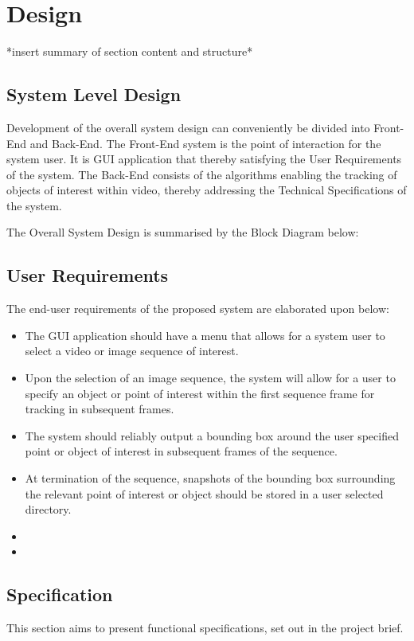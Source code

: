 \chapter{Design}\label{design}
*insert summary of section content and structure*

\section{System Level Design}
Development of the overall system design can conveniently be divided into
Front-End and Back-End. The Front-End system is the point of interaction for the
system user. It is GUI application that thereby satisfying the User Requirements
of the system. The Back-End consists of the algorithms enabling the tracking of
objects of interest within video, thereby addressing the Technical
Specifications of the system.

The Overall System Design is summarised by the Block Diagram below: 


\section{User Requirements}
The end-user requirements of the proposed system are elaborated upon below:
\begin{itemize}
    \item The GUI application should have a menu that allows for a system
        user to select a video or image sequence of interest.
    \item Upon the selection of an image sequence, the system will allow for a
        user to specify an object or point of interest within the first sequence
        frame for tracking in subsequent frames.
    \item The system should reliably output a bounding box around the user
        specified point or object of interest in subsequent frames of the
        sequence. 
    \item At termination of the sequence, snapshots of the bounding box
        surrounding the relevant point of interest or object should be stored in
        a user selected directory.
    \item
    \item 
\end{itemize}

\section{Specification}
This section aims to present functional specifications, set out in the
project brief.

